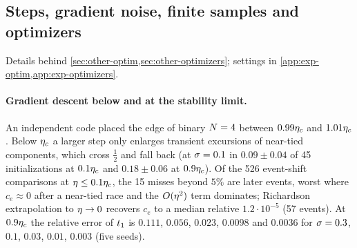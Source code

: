 \subsection{Steps, gradient noise, finite samples and optimizers}\label{app:D-optim}

Details behind \cref{sec:other-optim,sec:other-optimizers}; settings in \cref{app:exp-optim,app:exp-optimizers}.

\paragraph{Gradient descent below and at the stability limit.}
\empirical{} An independent code placed the edge of binary $N=4$ between $0.99\eta_c$ and $1.01\eta_c$. Below $\eta_c$ a
larger step only enlarges transient excursions of near-tied components, which cross $\frac12$ and fall back (at
$\sigma=0.1$ in $0.09\pm0.04$ of 45 initializations at $0.1\eta_c$ and $0.18\pm0.06$ at $0.9\eta_c$). Of the 526 event-shift
comparisons at $\eta\le0.1\eta_c$, the 15 misses beyond $5\%$ are later events, worst where $c_e\approx0$ after a near-tied
race and the $O(\eta^2)$ term dominates; Richardson extrapolation to $\eta\to0$ recovers $c_e$ to a median relative
$1.2\cdot10^{-5}$ (57 events). At $0.9\eta_c$ the relative error of $t_{1}$ is $0.111$, $0.056$, $0.023$, $0.0098$ and
$0.0036$ for $\sigma=0.3$, $0.1$, $0.03$, $0.01$, $0.003$ (five seeds).

